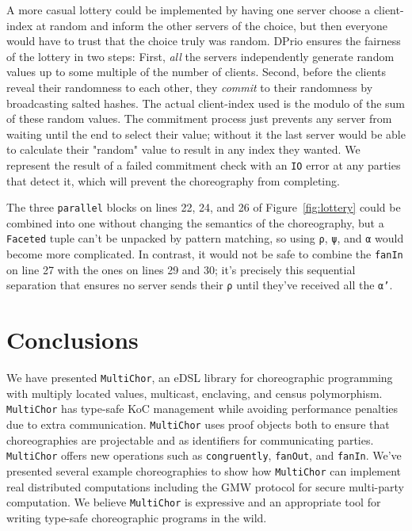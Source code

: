 \documentclass[sigplan,screen]{acmart}
\newcommand{\inlinecode}[2][haskell]{\texttt{#2}}
\newcommand{\MultiChor}{\texttt{Multi\-Chor}\xspace}
\begin{document}
A more casual lottery could be implemented by having one server choose a client-index at random
and inform the other servers of the choice,
but then everyone would have to trust that the choice truly was random.
DPrio ensures the fairness of the lottery in two steps:
First, \emph{all} the servers independently generate random values up to some multiple
of the number of clients.
Second, before the clients reveal their randomness to each other,
they \emph{commit} to their randomness by broadcasting salted hashes.
The actual client-index used is the modulo of the sum of these random values.
The commitment process just prevents any server from waiting until the end to select their value;
without it the last server would be able to calculate their "random" value to result in
any index they wanted.
We represent the result of a failed commitment check with an \inlinecode{IO} error
at any parties that detect it, which will prevent the choreography from completing.

The three \inlinecode{parallel} blocks on lines 22, 24, and 26 of Figure~\ref{fig:lottery}
could be combined into one without changing the semantics of the choreography,
but a \inlinecode{Faceted} tuple can't be unpacked by pattern matching,
so using \inlinecode{ρ}, \inlinecode{ψ}, and \inlinecode{α}
would become more complicated.
In contrast, it would not be safe to combine the \inlinecode{fanIn} on line 27
with the ones on lines 29 and 30;
it's precisely this sequential separation that ensures no server sends their \inlinecode{ρ}
until they've received all the \inlinecode{α'}.



\section{Conclusions}\label{sec:conclusion}

We have presented \MultiChor, an eDSL library for choreographic programming with
multiply located values, multicast, enclaving, and census polymorphism.
\MultiChor has type-safe KoC management
while avoiding performance penalties due to extra communication.
\MultiChor uses proof objects
both to ensure that choreographies are projectable and as identifiers
for communicating parties.
\MultiChor offers new operations such as \inlinecode{congruently},
\inlinecode{fanOut}, and \inlinecode{fanIn}.
We've presented several example choreographies to show how \MultiChor can implement
real distributed computations including the GMW protocol for secure multi-party computation.
We believe \MultiChor is expressive and an appropriate tool for writing
type-safe choreographic programs in the wild.
\end{document}
